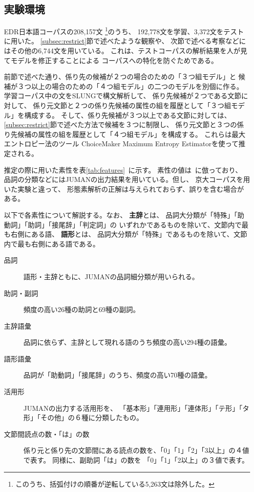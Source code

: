 \subsection{実験環境}\label{subsec:env}

EDR日本語コーパス\cite{EDR}の208,157文
\footnote{このうち、括弧付けの順番が逆転している5,263文は除外した。}のうち、
192,778文を学習、3,372文をテストに用いた。
\ref{subsec:restrict}節で述べたような観察や、
次節で述べる考察などにはその他の6,744文を用いている。
これは、テストコーパスの解析結果を人が見てモデルを修正することによる
コーパスへの特化を防ぐためである。

前節で述べた通り、係り先の候補が２つの場合のための「３つ組モデル」と
候補が３つ以上の場合のための「４つ組モデル」の二つのモデルを別個に作る。
学習コーパス中の文をSLUNGで構文解析して、
係り先候補が２つである文節に対して、
係り元文節と２つの係り先候補の属性の組を履歴として「３つ組モデル」を構成する。
そして、係り先候補が３つ以上である文節に対しては、
\ref{subsec:restrict}節で述べた方法で候補を３つに制限し、
係り元文節と３つの係り先候補の属性の組を履歴として「４つ組モデル」を構成する。
これらは最大エントロピー法のツール 
ChoiceMaker Maximum Entropy Estimator\cite{Borthwich99}を使って推定される。

推定の際に用いた素性を表\ref{tab:features}~に示す。
素性の値は\cite{Haruno98}~\cite{Uchimoto99}に倣っており、
品詞の分類などにはJUMANの出力結果を用いている。但し、
京大コーパスを用いた実験と違って、
形態素解析の正解は与えられておらず、誤りを含む場合がある。

以下で各素性について解説する。なお、
{\bf 主辞}とは、
品詞大分類が「特殊」「助動詞」「助詞」「接尾辞」「判定詞」の
いずれかであるものを除いて、文節内で最も右側にある語、
{\bf 語形}とは、
品詞大分類が「特殊」であるものを除いて、文節内で最も右側にある語である。


\begin{description}
\item[品詞] 語形・主辞ともに、JUMANの品詞細分類が用いられる。
\item[助詞・副詞] 頻度の高い26種の助詞と69種の副詞。
\item[主辞語彙] 品詞に依らず、主辞として現れる語のうち頻度の高い294種の語彙。
\item[語形語彙] 品詞が「助動詞」「接尾辞」のうち、頻度の高い70種の語彙。
\item[活用形] JUMANの出力する活用形を、
「基本形」「連用形」「連体形」「テ形」「タ形」「その他」の６種に分類したもの。
\item[文節間読点の数・「は」の数]
係り元と係り先の文節間にある読点の数を、「0」「1」「2」「3以上」の４値で表す。
同様に、副助詞「は」の数を 「0」「1」「2以上」の３値で表す。
\end{description}

